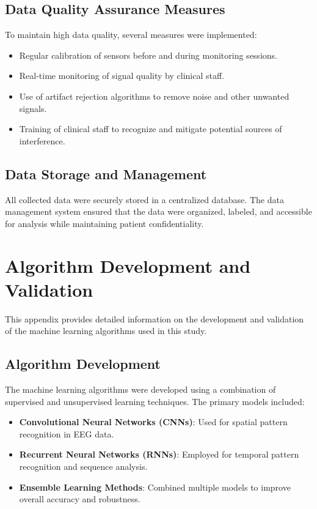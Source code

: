 \documentclass[12pt,journal,compsoc]{IEEEtran}
\begin{document}
\subsection{Data Quality Assurance Measures}
To maintain high data quality, several measures were implemented:
\begin{itemize}
    \item Regular calibration of sensors before and during monitoring sessions.
    \item Real-time monitoring of signal quality by clinical staff.
    \item Use of artifact rejection algorithms to remove noise and other unwanted signals.
    \item Training of clinical staff to recognize and mitigate potential sources of interference.
\end{itemize}

\subsection{Data Storage and Management}
All collected data were securely stored in a centralized database. The data management system ensured that the data were organized, labeled, and accessible for analysis while maintaining patient confidentiality.

\section{Algorithm Development and Validation}
This appendix provides detailed information on the development and validation of the machine learning algorithms used in this study.

\subsection{Algorithm Development}
The machine learning algorithms were developed using a combination of supervised and unsupervised learning techniques. The primary models included:
\begin{itemize}
    \item \textbf{Convolutional Neural Networks (CNNs)}: Used for spatial pattern recognition in EEG data.
    \item \textbf{Recurrent Neural Networks (RNNs)}: Employed for temporal pattern recognition and sequence analysis.
    \item \textbf{Ensemble Learning Methods}: Combined multiple models to improve overall accuracy and robustness.
\end{itemize}
\end{document}
